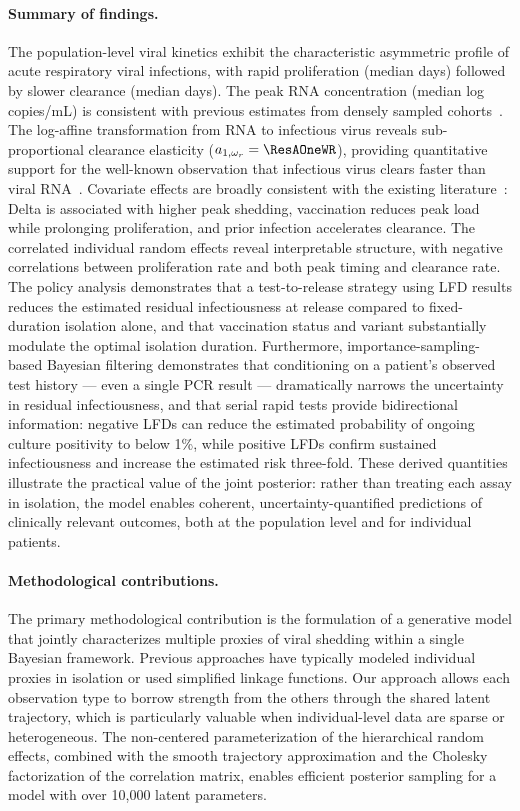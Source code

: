\documentclass[12pt]{article}
\begin{document}
\paragraph{Summary of findings.} The population-level viral kinetics exhibit the characteristic asymmetric profile of acute respiratory viral infections, with rapid proliferation (median \ResWP{} days) followed by slower clearance (median \ResWR{} days). The peak RNA concentration (median \ResDP{} log copies/mL) is consistent with previous estimates from densely sampled cohorts~\cite{ke2022daily,hay2022quantifying}. The log-affine transformation from RNA to infectious virus reveals sub-proportional clearance elasticity ($a_{1,\omega_r} = \ResAOneWR$), providing quantitative support for the well-known observation that infectious virus clears faster than viral RNA~\cite{cevik2021sars,wolk2020sars}. Covariate effects are broadly consistent with the existing literature~\cite{puhach2022infectious,kissler2021viral}: Delta is associated with higher peak shedding, vaccination reduces peak load while prolonging proliferation, and prior infection accelerates clearance. The correlated individual random effects reveal interpretable structure, with negative correlations between proliferation rate and both peak timing and clearance rate. The policy analysis demonstrates that a test-to-release strategy using LFD results reduces the estimated residual infectiousness at release compared to fixed-duration isolation alone, and that vaccination status and variant substantially modulate the optimal isolation duration. Furthermore, importance-sampling-based Bayesian filtering demonstrates that conditioning on a patient's observed test history --- even a single PCR result --- dramatically narrows the uncertainty in residual infectiousness, and that serial rapid tests provide bidirectional information: negative LFDs can reduce the estimated probability of ongoing culture positivity to below 1\%, while positive LFDs confirm sustained infectiousness and increase the estimated risk three-fold. These derived quantities illustrate the practical value of the joint posterior: rather than treating each assay in isolation, the model enables coherent, uncertainty-quantified predictions of clinically relevant outcomes, both at the population level and for individual patients.

\paragraph{Methodological contributions.} The primary methodological contribution is the formulation of a generative model that jointly characterizes multiple proxies of viral shedding within a single Bayesian framework. Previous approaches have typically modeled individual proxies in isolation or used simplified linkage functions. Our approach allows each observation type to borrow strength from the others through the shared latent trajectory, which is particularly valuable when individual-level data are sparse or heterogeneous. The non-centered parameterization of the hierarchical random effects, combined with the smooth trajectory approximation and the Cholesky factorization of the correlation matrix, enables efficient posterior sampling for a model with over 10{,}000 latent parameters.
\end{document}
